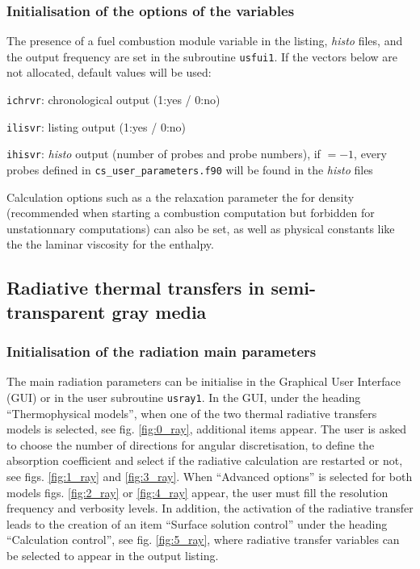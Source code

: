 {{{%
\subsubsection{Initialisation of the options of the variables}

The presence of a fuel combustion module variable in the listing, {\itshape histo} files, and the output frequency are set in the subroutine \texttt{usfui1}. If the vectors below are not allocated, default values will be used:
\begin{list}{-}{}
\item \texttt{ichrvr}: chronological output (1:yes / 0:no)
\item \texttt{ilisvr}: listing output (1:yes / 0:no)
\item \texttt{ihisvr}: {\itshape histo} output (number of probes and probe numbers), if $= -1$, every probes defined in \texttt{cs\_user\_parameters.f90} will be found in the {\itshape histo} files
\end{list}

Calculation options such as a the relaxation parameter the for density (recommended when starting a combustion computation but forbidden for unstationnary computations) can also be set, as well as physical constants like the the laminar viscosity for the enthalpy.

\subsection{Radiative thermal transfers in semi-transparent gray media}
\subsubsection{Initialisation of the radiation main parameters}

The main radiation parameters can be initialise in the Graphical User Interface (GUI) or in the user subroutine \texttt{usray1}. In the GUI, under the heading ``Thermophysical models'', when one of the two thermal radiative transfers models is selected, see fig. \ref{fig:0_ray}, additional items appear. The user is asked to choose the number of directions for angular discretisation, to define the absorption coefficient and select if the radiative calculation are restarted or not, see figs. \ref{fig:1_ray} and \ref{fig:3_ray}. When ``Advanced options'' is selected for both models figs. \ref{fig:2_ray} or \ref{fig:4_ray} appear, the user must fill the resolution frequency and verbosity levels. In addition, the activation of the radiative transfer leads to the creation of an item ``Surface solution control'' under the heading ``Calculation control'', see fig. \ref{fig:5_ray}, where radiative transfer variables can be selected to appear in the output listing.

}}}
